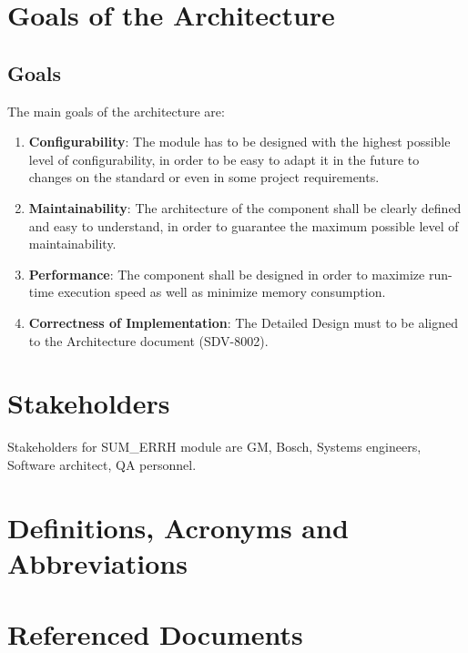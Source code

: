 \section{Goals of the Architecture}

\subsection{Goals}

The main goals of the architecture are:

\begin{enumerate}
\item \textbf{Configurability}: The module has to be designed with the highest possible level of configurability, in order to be easy to adapt it in the future to changes on the standard or even in some project requirements.
\item \textbf{Maintainability}: The architecture of the component shall be clearly defined and easy to understand, in order to guarantee the maximum possible level of maintainability.
\item \textbf{Performance}: The component shall be designed in order to maximize run-time execution speed as well as minimize memory consumption.
\item \textbf{Correctness of Implementation}: The Detailed Design must to be aligned to the Architecture document (SDV-8002).
\end{enumerate}

\section{Stakeholders}

Stakeholders for SUM_ERRH module are GM, Bosch, Systems engineers, Software architect, QA personnel.

\section{Definitions, Acronyms and Abbreviations}



\section{Referenced Documents}

